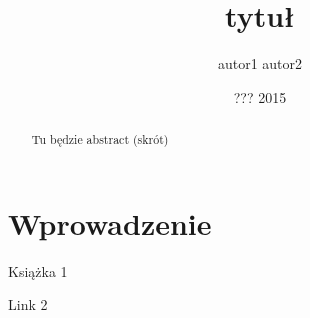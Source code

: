 \documentclass[licencjacka]{pracamgr}
\author{autor1
autor2}
\title{tytuł}
\date{??? 2015}
\begin{document}
\maketitle

\begin{abstract}
Tu będzie abstract (skrót)
\end{abstract}


\tableofcontents

\chapter*{Wprowadzenie}

\begin{thebibliography}{99}

 Książka 1

 Link 2

\end{thebibliography}
\end{document}
